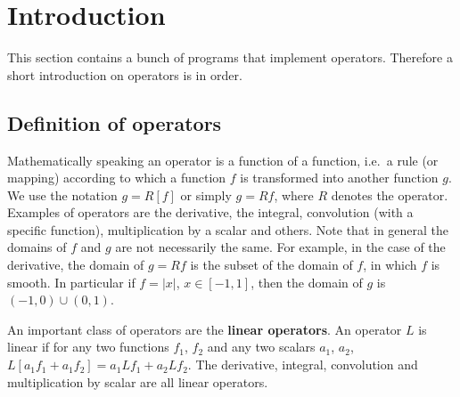 \section{Introduction}

This section contains a bunch of programs that implement operators. Therefore a short introduction on operators is in order.

\subsection{Definition of operators}
Mathematically speaking an operator is a function of a function, i.e.~a rule (or mapping) according to which a function  $f$ is transformed into another function $g$. We use the notation $g=R[f]$ or simply $g=Rf$, where $R$ denotes the operator. Examples of operators are the derivative, the integral, convolution (with a specific function), multiplication by a scalar and others. Note that in general the domains of $f$ and $g$ are not necessarily the same. For example, in the case of the derivative, the domain of $g=Rf$ is the subset of the domain of $f$, in which $f$ is smooth. In particular if $f=|x|$, $x\in[-1,1]$, then the domain of $g$ is $(-1,0)\cup(0,1)$. 

An important class of operators are the \textbf{linear operators}. An operator $L$ is linear if for any two functions $f_1$, $f_2$ and any two scalars $a_1$, $a_2$, $L[a_1f_1+a_1f_2]=a_1Lf_1 + a_2Lf_2$. The derivative, integral, convolution and multiplication by scalar are all linear operators.

